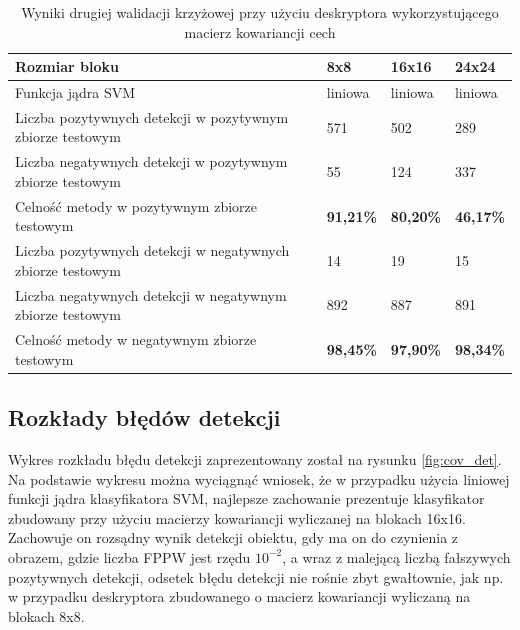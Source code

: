 \begin{center}
    \begin{longtable}{ | p{5cm} | p{3cm} | p{3cm} | p{3cm} |}
    \caption{Wyniki drugiej walidacji krzyżowej przy użyciu deskryptora wykorzystującego macierz kowariancji cech}
    \label{tab:cov_second} \\
    \hline
	Rozmiar bloku & 8x8 & 16x16 & 24x24 \\ \hline
	Funkcja jądra SVM & liniowa & liniowa & liniowa  \\ \hline
    Liczba pozytywnych detekcji w pozytywnym zbiorze testowym & 571 & 502 & 289 \\ \hline
    Liczba negatywnych detekcji w pozytywnym zbiorze testowym & 55 & 124 & 337 \\ \hline
    Celność metody w pozytywnym zbiorze testowym & \textbf{91,21\%} & \textbf{80,20\%} & \textbf{46,17\%} \\ \hline
    Liczba pozytywnych detekcji w negatywnych zbiorze testowym & 14 & 19 & 15 \\ \hline
    Liczba negatywnych detekcji w negatywnym zbiorze testowym & 892 & 887 & 891 \\ \hline
    Celność metody w negatywnym zbiorze testowym & \textbf{98,45\%} & \textbf{97,90\%} & \textbf{98,34\%} \\ \hline
    \end{longtable}
\end{center}


\subsection{Rozkłady błędów detekcji}

Wykres rozkładu błędu detekcji zaprezentowany został na rysunku \ref{fig:cov_det}. Na podstawie wykresu można wyciągnąć wniosek, że w przypadku użycia liniowej funkcji jądra klasyfikatora SVM, najlepsze zachowanie prezentuje klasyfikator zbudowany przy użyciu macierzy kowariancji wyliczanej na blokach 16x16. Zachowuje on rozsądny wynik detekcji obiektu, gdy ma on do czynienia z obrazem, gdzie liczba FPPW jest rzędu $10^{-2}$, a wraz z malejącą liczbą fałszywych pozytywnych detekcji, odsetek błędu detekcji nie rośnie zbyt gwałtownie, jak np. w przypadku deskryptora zbudowanego o macierz kowariancji wyliczaną na blokach 8x8.


